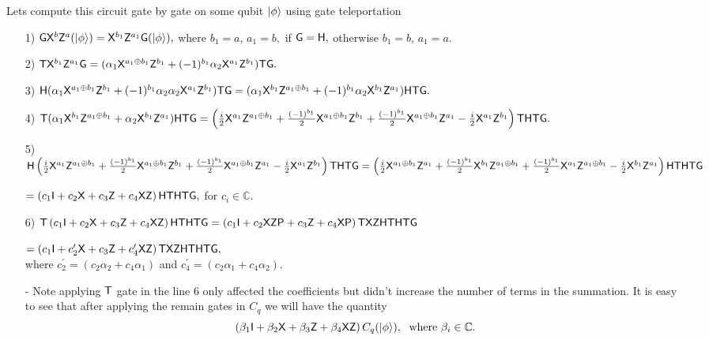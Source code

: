 Lets compute this circuit gate by gate on some qubit ${\lvert}\phi\rangle$ using gate teleportation 
 \begin{enumerate}
\item[1)] $\textsf{G} {\sf X}^{b}{\sf Z}^{a}({\lvert}\phi\rangle)={\sf X}^{b_1}{\sf Z}^{a_1}\textsf{G}({\lvert}\phi\rangle),$
where $b_1=a,\, a_1=b,$ if $\textsf{G} ={\sf H},$  otherwise   $b_1=b,\, a_1=a.$\\
\item[2)] ${\sf T}{\sf X}^{b_1}{\sf Z}^{a_1}\textsf{G}= (\alpha_1{\sf X}^{a_1\oplus b_1 }{\sf Z}^{b_1} +(-1)^{b_1} \alpha_2{\sf X}^{a_1}{\sf Z}^{b_1}){\sf T} \textsf{G}.$
\item[3)]   ${\sf H} (\alpha_1{\sf X}^{a_1\oplus b_1 }{\sf Z}^{b_1} + (-1)^{b_1} \alpha_2\alpha_2{\sf X}^{a_1}{\sf Z}^{b_1}){\sf T} \textsf{G}=(\alpha_1{\sf X}^{b_1}{\sf Z}^{a_1\oplus b_1 } + (-1)^{b_1} \alpha_2{\sf X}^{b_1}{\sf Z}^{a_1}) {\sf H} {\sf T} \textsf{G}.$ 
\item[4)] ${\sf T}(\alpha_1{\sf X}^{b_1}{\sf Z}^{a_1\oplus b_1 } + \alpha_2{\sf X}^{b_1}{\sf Z}^{a_1}) {\sf H} {\sf T} \textsf{G}=\left(\frac{i}{2}{\sf X}^{a_1}{\sf Z}^{a_1\oplus b_1 } +  \frac{(-1)^{b_1}}{2}{\sf X}^{a_1\oplus b_1}{\sf Z}^{b_1}+
   \frac{(-1)^{b_1}}{2}{\sf X}^{a_1\oplus b_1}{\sf Z}^{a_1}  - \frac{i}{2}{\sf X}^{a_1}{\sf Z}^{b_1} \right) {\sf T}{\sf H} {\sf T} \textsf{G}.$
   
\item[5)]${\sf H}  \left(\frac{i}{2}{\sf X}^{a_1}{\sf Z}^{a_1\oplus b_1 } +  \frac{(-1)^{b_1}}{2}{\sf X}^{a_1\oplus b_1}{\sf Z}^{b_1}+
   \frac{(-1)^{b_1}}{2}{\sf X}^{a_1\oplus b_1}{\sf Z}^{a_1}  - \frac{i}{2}{\sf X}^{a_1}{\sf Z}^{b_1} \right){\sf T}{\sf H} {\sf T} \textsf{G}\\=  \left(\frac{i}{2}{\sf X}^{a_1\oplus b_1}{\sf Z}^{a_1} +  \frac{(-1)^{b_1}}{2}{\sf X}^{b_1}{\sf Z}^{a_1\oplus b_1}+
   \frac{(-1)^{b_1}}{2}{\sf X}^{a_1}{\sf Z}^{a_1\oplus b_1}  - \frac{i}{2}{\sf X}^{b_1}{\sf Z}^{a_1} \right){\sf H} {\sf T}{\sf H} {\sf T} \textsf{G}$

   $=\left(c_1{\sf I}+ c_2{\sf X}+c_3{\sf Z}+c_4{\sf X}{\sf Z}\right){\sf H}{\sf T}{\sf H} {\sf T} \textsf{G},$  for $c_i\in \mathbb{C}.$ 
\item[6)]  ${\sf T}\left(c_1{\sf I}+ c_2{\sf X}+c_3{\sf Z}+c_4{\sf X}{\sf Z}\right){\sf H}{\sf T}{\sf H} {\sf T} \textsf{G}=\left(c_1{\sf I}+ c_2{\sf X} {\sf Z}{\sf P}+c_3{\sf Z} +c_4{\sf X}{\sf P}\right){\sf T} {\sf X}{\sf Z}{\sf H}{\sf T}{\sf H} {\sf T} \textsf{G}$

 \hspace{2.3in}   $=\left(c_1{\sf I}+ c_2^\prime{\sf X}+c_3{\sf Z}+c_4^\prime{\sf X}{\sf Z}\right){\sf T} {\sf X}{\sf Z}{\sf H}{\sf T}{\sf H} {\sf T} \textsf{G},$ \\ 
  where $c_2^\prime=(c_2\alpha_2+c_4\alpha_1)$ and $c_4^\prime=(c_2\alpha_1+c_4\alpha_2).$ 
\item[-] Note applying ${\sf T}$ gate in the line 6 only affected the coefficients but didn't increase the number of terms in the summation. It is easy to see that after applying the remain gates in $C_q$ we will have the quantity
$$\left(\beta_1 {\sf I}+\beta_2 {\sf X}+\beta_3 {\sf Z}+\beta_4 {\sf X} {\sf Z}\right) C_q({\lvert}\phi\rangle), \; \mbox{ where } \beta_i\in \mathbb{C}.$$
\end{enumerate}
